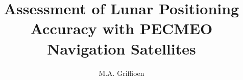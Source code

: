 \title{Assessment of Lunar Positioning Accuracy with PECMEO Navigation Satellites}
\author{M.A. Griffioen}
